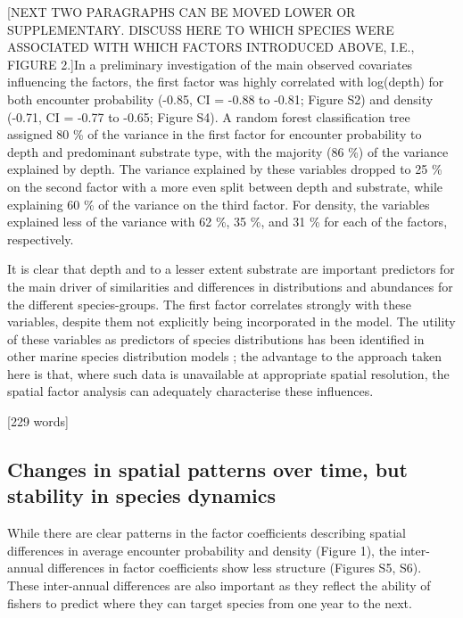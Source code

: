 \documentclass{nature}
\begin{document}
\begin{linenumbers}
[365 words]

[NEXT TWO PARAGRAPHS CAN BE MOVED LOWER OR SUPPLEMENTARY. DISCUSS HERE TO WHICH
SPECIES WERE ASSOCIATED WITH WHICH FACTORS INTRODUCED ABOVE, I.E., FIGURE 2.]In
a preliminary investigation of the main observed covariates influencing the
factors, the first factor was highly correlated with log(depth) for both
encounter probability (-0.85, CI = -0.88 to -0.81; Figure S2) and density
(-0.71, CI = -0.77 to -0.65; Figure S4). A random forest classification tree
assigned 80 \% of the variance in the first factor for encounter probability to
depth and predominant substrate type, with the majority (86 \%) of the variance
explained by depth. The variance explained by these variables dropped to 25 \%
on the second factor with a more even split between depth and substrate, while
explaining 60 \% of the variance on the third factor.  For density, the
variables explained less of the variance with 62 \%, 35 \%, and 31 \% for each
of the factors, respectively.

It is clear that depth and to a lesser extent substrate are important
predictors for the main driver of similarities and differences in distributions
and abundances for the different species-groups. The first factor correlates
strongly with these variables, despite them not explicitly being incorporated
in the model. The utility of these variables as predictors of species
distributions has been identified in other marine species distribution models
\cite{Robinson2011}; the advantage to the approach taken here is that, where
such data is unavailable at appropriate spatial resolution, the spatial factor
analysis can adequately characterise these influences.

[229 words]

\subsection{Changes in spatial patterns over time, but stability in species
	dynamics}

While there are clear patterns in the factor coefficients describing spatial
differences in average encounter probability and density (Figure 1), the
inter-annual differences in factor coefficients show less structure (Figures
S5, S6). These inter-annual differences are also important as they reflect the
ability of fishers to predict where they can target species from one year to
the next.


\end{linenumbers}
\end{document}
